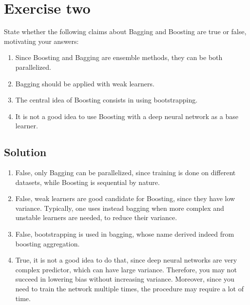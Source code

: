 \section{Exercise two}

State whether the following claims about Bagging and Boosting are true or false, motivating your answers:
\begin{enumerate}
    \item Since Boosting and Bagging are ensemble methods, they can be both parallelized.
    \item Bagging should be applied with weak learners.
    \item The central idea of Boosting consists in using bootstrapping.
    \item It is not a good idea to use Boosting with a deep neural network as a base learner.
\end{enumerate}

\subsection*{Solution}
\begin{enumerate}
    \item False, only Bagging can be parallelized, since training is done on different datasets, while Boosting is sequential by nature.
    \item  False, weak learners are good candidate for Boosting, since they have low variance. 
        Typically, one uses instead bagging when more complex and unstable learners are needed, to reduce their variance.
    \item  False, bootstrapping is used in bagging, whose name derived indeed from boosting aggregation.
    \item  True, it is not a good idea to do that, since deep neural networks are very complex predictor, which can have large variance. 
        Therefore, you may not succeed in lowering bias without increasing variance. 
        Moreover, since you need to train the network multiple times, the procedure may require a lot of time.
\end{enumerate}